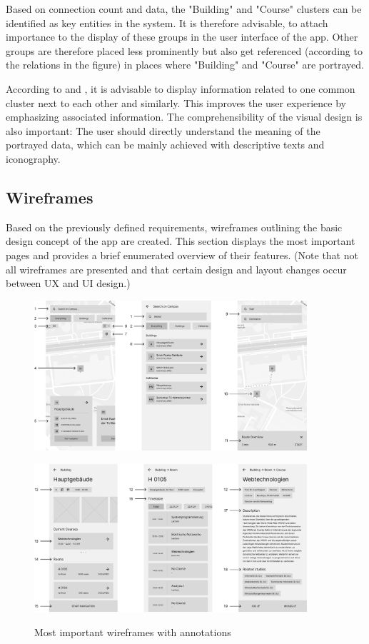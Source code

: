Based on connection count and data, the "Building" and "Course" clusters can be identified as key entities in the system. It is therefore advisable, to attach importance to the display of these groups in the user interface of the app. Other groups are therefore placed less prominently but also get referenced (according to the relations in the figure) in places where "Building" and "Course" are portrayed.

According to \cite{law_of_common_region} and \cite{law_of_similarity}, it is advisable to display information related to one common cluster next to each other and similarly. This improves the user experience by emphasizing associated information. The comprehensibility of the visual design is also important: The user should directly understand the meaning of the portrayed data, which can be mainly achieved with descriptive texts and iconography.

\subsection{Wireframes}
Based on the previously defined requirements, wireframes outlining the basic design concept of the app are created. This section displays the most important pages and provides a brief enumerated overview of their features. (Note that not all wireframes are presented and that certain design and layout changes occur between UX and UI design.)

\begin{figure}[H]
	\centering
	\includegraphics[width=0.9\textwidth]{images/wireframes_1.png}\\
\end{figure}

\begin{figure}[H]
	\centering
	\includegraphics[width=0.9\textwidth]{images/wireframes_2.png}\\
	\caption{Most important wireframes with annotations}
\end{figure}


